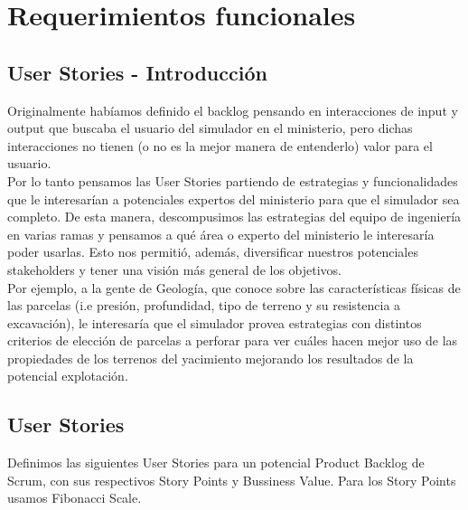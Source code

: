 \section{Requerimientos funcionales}

\newcommand{\BV}[0]{Business Value}
\newcommand{\SP}{Story Points}
\newcommand{\US}[1]{\textbf{US #1}}
\newcommand{\fixme}[1]{\large\textcolor{red}{#1}}

\subsection{User Stories - Introducción}

Originalmente habíamos definido el backlog pensando en interacciones de input y output que buscaba el usuario del simulador en el ministerio, pero dichas interacciones no tienen (o no es la mejor manera de entenderlo) valor para el usuario.
\\

Por lo tanto pensamos las User Stories partiendo de estrategias y funcionalidades que le interesarían a potenciales expertos del ministerio para que el simulador sea completo. De esta manera, descompusimos las estrategias del equipo de ingeniería en varias ramas y pensamos a qué área o experto del ministerio le interesaría poder usarlas. Esto nos permitió, además, diversificar nuestros potenciales stakeholders y tener una visión más general de los objetivos.
\\

Por ejemplo, a la gente de Geología, que conoce sobre las características físicas de las parcelas (i.e presión, profundidad, tipo de terreno y su resistencia a excavación), le interesaría que el simulador provea estrategias con distintos criterios de elección de parcelas a perforar para ver cuáles hacen mejor uso de las propiedades de los terrenos del yacimiento mejorando los resultados de la potencial explotación.

\subsection{User Stories}

Definimos las siguientes User Stories para un potencial Product Backlog de Scrum, con sus respectivos Story Points y Bussiness Value. Para los Story Points usamos Fibonacci Scale.


